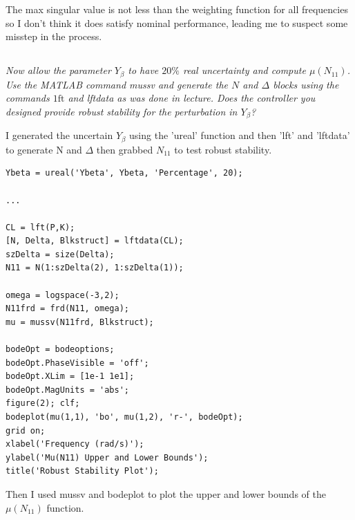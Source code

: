 \documentclass{article}
\begin{document}
The max singular value is not less than the weighting function for all frequencies so I don't think it does satisfy nominal performance, leading me to suspect some misstep in the process.

\subsection{}

\textit{Now allow the parameter $Y_\beta$ to have $20\%$ real uncertainty and compute $\mu\left(N_{11}\right)$. Use the MATLAB command mussv and generate the $N$ and $\Delta$ blocks using the commands $1 \mathrm{ft}$ and lftdata as was done in lecture. Does the controller you designed provide robust stability for the perturbation in $Y_\beta$?}

I generated the uncertain $Y_\beta$ using the 'ureal' function and then 'lft' and 'lftdata' to generate N and $\Delta$ then grabbed $N_{11}$ to test robust stability.

\begin{lstlisting}
Ybeta = ureal('Ybeta', Ybeta, 'Percentage', 20);

...

CL = lft(P,K);
[N, Delta, Blkstruct] = lftdata(CL);
szDelta = size(Delta);
N11 = N(1:szDelta(2), 1:szDelta(1));

omega = logspace(-3,2);
N11frd = frd(N11, omega);
mu = mussv(N11frd, Blkstruct);

bodeOpt = bodeoptions;
bodeOpt.PhaseVisible = 'off';
bodeOpt.XLim = [1e-1 1e1];
bodeOpt.MagUnits = 'abs';
figure(2); clf;
bodeplot(mu(1,1), 'bo', mu(1,2), 'r-', bodeOpt);
grid on;
xlabel('Frequency (rad/s)');
ylabel('Mu(N11) Upper and Lower Bounds');
title('Robust Stability Plot');    
\end{lstlisting}

Then I used mussv and bodeplot to plot the upper and lower bounds of the $\mu(N_{11})$ function.
\end{document}
